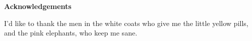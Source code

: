 \pagestyle{plain}

\begin{center}
    {\LARGE\bf Acknowledgements}
\end{center}


I'd like to thank the men in the white coats who give me the little yellow pills, 
and the pink elephants, who keep me sane.

